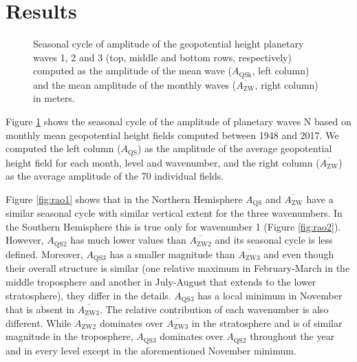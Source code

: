 \documentclass[draft,linenumbers]{agujournal2018}
\begin{document}
\section{Results}

\begin{figure}[h]

{\centering {}\newline{}

}

\caption{Seasonal cycle of amplitude of the geopotential height planetary waves 1, 2 and 3 (top, middle and bottom rows, respectively) computed as the amplitude of the mean wave ($A_\mathrm{QSk}$, left column) and the mean amplitude of the monthly waves ($\overline{A_\mathrm{ZW} }$, right column) in meters.}\label{fig:rao}
\end{figure}

Figure \ref{fig:rao} shows the seasonal cycle of the amplitude of
planetary waves N based on monthly mean geopotential height fields
computed between 1948 and 2017. We computed the left column
(\(A_\mathrm{QS}\)) as the amplitude of the average geopotential height
field for each month, level and wavenumber, and the right column
(\(\overline{A_\mathrm{ZW}}\)) as the average amplitude of the 70
individual fields.

Figure \ref{fig:rao1} shows that in the Northern Hemisphere
\(A_\mathrm{QS}\) and \(\overline{A_\mathrm{ZW}}\) have a similar
seasonal cycle with similar vertical extent for the three wavenumbers.
In the Southern Hemisphere this is true only for wavenumber 1 (Figure
\ref{fig:rao2}). However, \(A_\mathrm{QS2}\) has much lower values than
\(\overline{A_\mathrm{ZW2}}\) and its seasonal cycle is less defined.
Moreover, \(A_\mathrm{QS3}\) has a smaller magnitude than
\(\overline{A_\mathrm{ZW3}}\) and even though their overall structure is
similar (one relative maximum in February-March in the middle
troposphere and another in July-August that extends to the lower
stratosphere), they differ in the details. \(A_\mathrm{QS3}\) has a
local minimum in November that is absent in
\(\overline{A_\mathrm{ZW3}}\). The relative contribution of each
wavenumber is also different. While \(\overline{A_\mathrm{ZW2}}\)
dominates over \(\overline{A_\mathrm{ZW3}}\) in the stratosphere and is
of similar magnitude in the troposphere, \(A_\mathrm{QS3}\) dominates
over \(A_\mathrm{QS2}\) throughout the year and in every level except in
the aforementioned November minimum.
\end{document}
